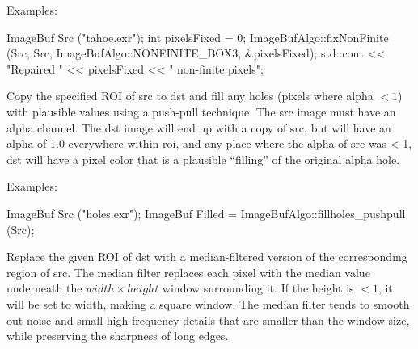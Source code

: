 \smallskip
\noindent Examples:
\begin{code}
    ImageBuf Src ("tahoe.exr");
    int pixelsFixed = 0;
    ImageBufAlgo::fixNonFinite (Src, Src, ImageBufAlgo::NONFINITE_BOX3,
                                &pixelsFixed);
    std::cout << "Repaired " << pixelsFixed << " non-finite pixels\n";
\end{code}
\apiend


 
Copy the specified ROI of {\cf src} to {\cf dst} and fill any
holes (pixels where alpha $< 1$) with plausible values using a push-pull
technique.  The {\cf src} image must have
an alpha channel.  The dst image will end up with a copy of src, but
will have an alpha of 1.0 everywhere within {\cf roi},
and any place where the alpha
of src was < 1, dst will have a pixel color that is a plausible
``filling'' of the original alpha hole.

\smallskip
\noindent Examples:
\begin{code}
    ImageBuf Src ("holes.exr");
    ImageBuf Filled = ImageBufAlgo::fillholes_pushpull (Src);
\end{code}
\apiend


 

Replace the given ROI of {\cf dst} with a median-filtered version of the
corresponding region of {\cf src}.  The median filter replaces each pixel
with the median value underneath the $\mathit{width} \times \mathit{height}$
window surrounding it. If the height is $< 1$, it will be set to width,
making a square window. The median filter tends to smooth out noise and
small high frequency details that are smaller than the window size, while
preserving the sharpness of long edges.

